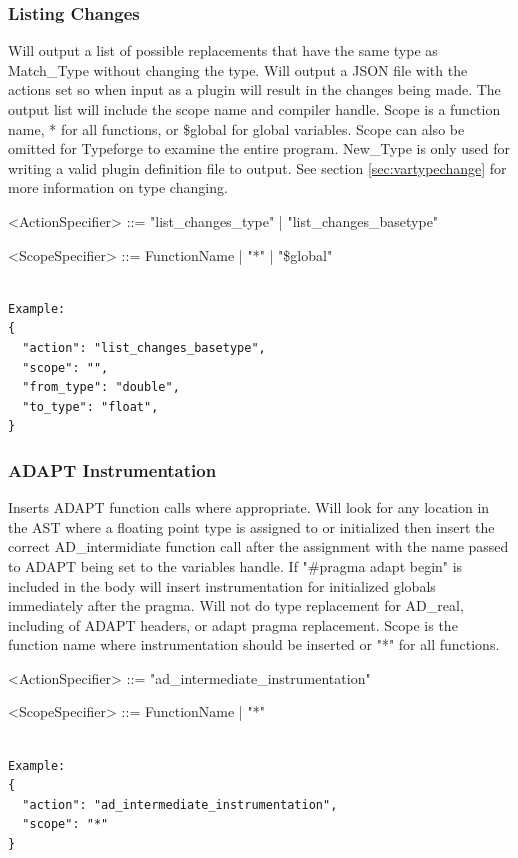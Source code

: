\documentclass[natbib]{article}
\begin{document}
\subsubsection{Listing Changes} \label{sec:listChange}
Will output a list of possible replacements that have the same type as Match\_Type without changing the type. 
Will output a JSON file with the actions set so when input as a plugin will result in the changes being made. 
The output list will include the scope name and compiler handle. Scope is a function name, * for all functions, 
or \$global for global variables. Scope can also be omitted for Typeforge to examine the entire program. 
New\_Type is only used for writing a valid plugin definition file to output. 
See section \ref{sec:vartypechange} for more information on type changing. 

\begin{grammar}
<ActionSpecifier>  ::= "list_changes_type" | "list_changes_basetype"

<ScopeSpecifier> ::= FunctionName | "*" | "\$global"
\end{grammar}
\begin{verbatim}  

Example:
{
  "action": "list_changes_basetype",
  "scope": "",
  "from_type": "double",
  "to_type": "float",
}
\end{verbatim}

\subsubsection{ADAPT Instrumentation}
Inserts ADAPT function calls where appropriate. Will look for any location in the AST where a floating 
point type is assigned to or initialized then insert the correct AD\_intermidiate function 
call after the assignment with the name passed to ADAPT being set to the variables handle. 
If "\#pragma adapt begin" is included in the body will insert instrumentation for initialized 
globals immediately after the pragma. Will not do type replacement for AD\_real, including 
of ADAPT headers, or adapt pragma replacement. Scope is the function name where 
instrumentation should be inserted or "*" for all functions.

\begin{grammar}
<ActionSpecifier> ::= "ad_intermediate_instrumentation"

<ScopeSpecifier>     ::=  FunctionName | "*"
\end{grammar}
\begin{verbatim}  

Example:
{
  "action": "ad_intermediate_instrumentation",
  "scope": "*"
}
\end{verbatim}
\end{document}
